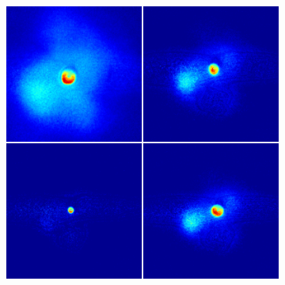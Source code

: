 \begin{figure}[h!]
\begin{subfigure}[l]{0.4\textwidth}
\includegraphics[width=1\textwidth]{../Images/results/MIR_Ne_XeDop_39K/RAw_NE_37Klowdop.png} 
\end{subfigure} \hfill



\end{figure}
